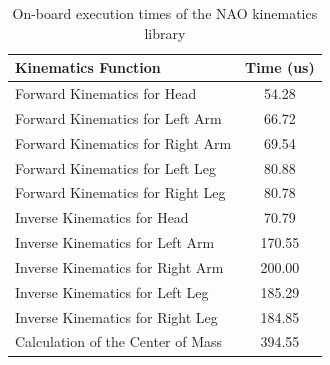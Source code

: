 
\begin{table}[!t]
\caption{On-board execution times of the NAO kinematics library}
\label{times}
\begin{center}
\begin{tabularx}{9.3cm}{lc}
\toprule%
\textbf{Kinematics Function} & \textbf{Time (us)}\\
\midrule [\heavyrulewidth]%
Forward Kinematics for Head & 54.28 \\
Forward Kinematics for Left Arm & 66.72 \\
Forward Kinematics for Right Arm & 69.54 \\
Forward Kinematics for Left Leg & 80.88 \\
Forward Kinematics for Right Leg & 80.78 \\
Inverse Kinematics for Head & 70.79 \\
Inverse Kinematics for Left Arm & 170.55 \\
Inverse Kinematics for Right Arm & 200.00 \\
Inverse Kinematics for Left Leg & 185.29 \\
Inverse Kinematics for Right Leg & 184.85 \\
Calculation of the Center of Mass & 394.55 \\
\bottomrule%
\end{tabularx}
\end{center}
\end{table}

